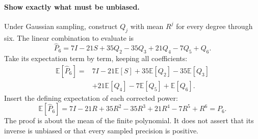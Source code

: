 \documentclass[11pt]{article}
\newcommand{\E}{\mathbb{E}}
\begin{document}
\paragraph{Show exactly what must be unbiased.}
Under Gaussian sampling, construct $Q_j$ with mean $R^j$ for every degree
through six. The linear combination to evaluate is
\begin{equation}
 \widehat P_6=7I-21S+35Q_2-35Q_3+21Q_4-7Q_5+Q_6.
\end{equation}
Take its expectation term by term, keeping all coefficients:
\begin{equation}
 \begin{split}
 \E[\widehat P_6]={}&7I-21\E[S]+35\E[Q_2]-35\E[Q_3]\\
                   &+21\E[Q_4]-7\E[Q_5]+\E[Q_6].
 \end{split}
\end{equation}
Insert the defining expectation of each corrected power:
\begin{equation}
 \E[\widehat P_6]=7I-21R+35R^2-35R^3+21R^4-7R^5+R^6=P_6.
\end{equation}
The proof is about the mean of the finite polynomial. It does not assert
that its inverse is unbiased or that every sampled precision is positive.
\end{document}
